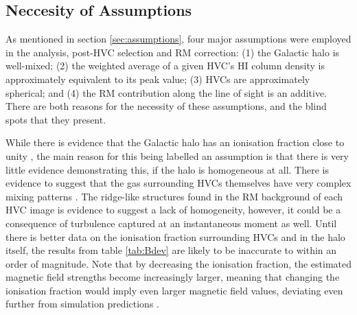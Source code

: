 \subsection{Neccesity of Assumptions}
\label{ssec:B2}

As mentioned in section \ref{sec:assumptions}, four major assumptions were employed in the analysis, post-HVC selection and RM correction: (1) the Galactic halo is well-mixed; (2) the weighted average of a given HVC's HI column density is approximately equivalent to its peak value; (3) HVCs are approximately spherical; and (4) the RM contribution along the line of sight is an additive. There are both reasons for the necessity of these assumptions, and the blind spots that they present.


While there is evidence that the Galactic halo has an ionisation fraction close to unity \citep{ID23}, the main reason for this being labelled an assumption is that there is very little evidence demonstrating this, if the halo is homogeneous at all. There is evidence to suggest that the gas surrounding HVCs themselves have very complex mixing patterns \cite{ID69, ID4}. The ridge-like structures found in the RM background of each HVC image is evidence to suggest a lack of homogeneity, however, it could be a consequence of turbulence captured at an instantaneous moment as well. Until there is better data on the ionisation fraction surrounding HVCs and in the halo itself, the results from table \ref{tab:Bdev} are likely to be inaccurate to within an order of magnitude. Note that by decreasing the ionisation fraction, the estimated magnetic field strengths become increasingly larger, meaning that changing the ionisation fraction would imply even larger magnetic field values, deviating even further from simulation predictions \citep{ID24}.


